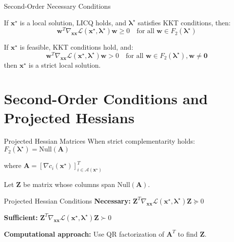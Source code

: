 \documentclass[aspectratio=1610]{beamer}
\begin{document}
\begin{frame}{Second-Order Necessary Conditions}
  \begin{theorem}
    If $\mathbf{x}^{\star}$ is a local solution, LICQ holds, and $\boldsymbol{\lambda}^{\star}$ satisfies KKT conditions, then:
    $$\mathbf{w}^T \nabla_{\mathbf{x}\mathbf{x}} \mathcal{L}(\mathbf{x}^{\star}, \boldsymbol{\lambda}^{\star}) \mathbf{w} \geq 0 \quad \text{for all } \mathbf{w} \in F_2(\boldsymbol{\lambda}^{\star})$$
  \end{theorem}
  
  \begin{theorem}
    If $\mathbf{x}^{\star}$ is feasible, KKT conditions hold, and:
    $$\mathbf{w}^T \nabla_{\mathbf{x}\mathbf{x}} \mathcal{L}(\mathbf{x}^{\star}, \boldsymbol{\lambda}^{\star}) \mathbf{w} > 0 \quad \text{for all } \mathbf{w} \in F_2(\boldsymbol{\lambda}^{\star}), \mathbf{w} \neq \mathbf{0}$$
    then $\mathbf{x}^{\star}$ is a strict local solution.
  \end{theorem}
\end{frame}

\section{Second-Order Conditions and Projected Hessians}
\begin{frame}{Projected Hessian Matrices}
  When strict complementarity holds: $F_2(\boldsymbol{\lambda}^{\star}) = \text{Null}(\mathbf{A})$
  
  where $\mathbf{A} = [\nabla c_i(\mathbf{x}^{\star})]_{i \in \mathcal{A}(\mathbf{x}^{\star})}^T$
  
  \vspace{0.3cm}
  Let $\mathbf{Z}$ be matrix whose columns span $\text{Null}(\mathbf{A})$.
  
  \begin{block}{Projected Hessian Conditions}
    \textbf{Necessary:} $\mathbf{Z}^T \nabla_{\mathbf{x}\mathbf{x}} \mathcal{L}(\mathbf{x}^{\star}, \boldsymbol{\lambda}^{\star}) \mathbf{Z} \succeq 0$
    
    \textbf{Sufficient:} $\mathbf{Z}^T \nabla_{\mathbf{x}\mathbf{x}} \mathcal{L}(\mathbf{x}^{\star}, \boldsymbol{\lambda}^{\star}) \mathbf{Z} \succ 0$
  \end{block}
  
  \vspace{0.3cm}
  \textbf{Computational approach:} Use QR factorization of $\mathbf{A}^T$ to find $\mathbf{Z}$.
\end{frame}
\end{document}
